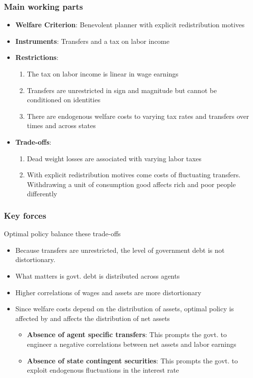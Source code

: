 \documentclass{beamer}
\begin{document}
\begin{frame}
 \frametitle{Main working parts}
\begin{itemize}
 \item \textbf{Welfare Criterion}: Benevolent planner with explicit redistribution motives
 \item \textbf{Instruments}: Transfers and a tax on labor income 
 \item \textbf{Restrictions}:
 \begin{enumerate}
  \item The tax on labor income is linear in wage earnings
  \item Transfers are unrestricted in sign and magnitude  but cannot be conditioned on identities
  \item There are endogenous welfare costs to varying tax rates and transfers over times and across states
 \end{enumerate}
\item \textbf{Trade-offs}:
\begin{enumerate}
\item Dead weight losses are associated with varying labor taxes
\item With  explicit redistribution motives come costs of fluctuating transfers. Withdrawing a unit of consumption good affects rich and poor people differently
\end{enumerate}
\end{itemize}
\end{frame}
\begin{frame}
 \frametitle{Key forces}
 Optimal policy balance these trade-offs
 \begin{itemize}
 \item Because transfers are unrestricted, the level of government debt is not distortionary.
 \item  What matters is govt. debt is distributed across agents
 \item Higher correlations of wages and assets are more distortionary
 \item Since welfare costs depend on the distribution of assets, optimal policy is affected by and affects the distribution of net assets
\begin{itemize}
\item \textbf{Absence of agent specific transfers}: This prompts the govt. to engineer  a negative correlations between net assets and labor earnings
\item \textbf{Absence of state contingent securities}: This prompts the govt. to exploit endogenous fluctuations in the interest rate
\end{itemize}

 \end{itemize}

\end{frame}
\end{document}
